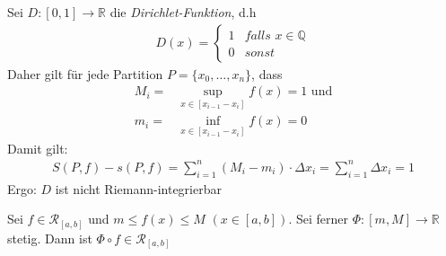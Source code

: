 \begin{Beispiel}{
	Sei $D:[0,1] \rightarrow \mathbb{R}$ die \emph{Dirichlet-Funktion}, d.h
	\begin{align*}
		D(x) = \begin{cases}
			1 & \textit{falls } x \in \mathbb{Q} \\
			0 & sonst
		\end{cases}
	\end{align*}
	Daher gilt für jede Partition $P = \{x_0, \hdots, x_n\}$, dass 
	\begin{align*}
		M_i = & \sup_{x \in [x_{i-1}-x_i]} f(x) = 1 \text{ und}\\
		m_i = & \inf_{x \in [x_{i-1}-x_i]} f(x) = 0
	\end{align*}
	Damit gilt:
	\begin{align*}
		S(P,f) - s(P,f) = \sum_{i = 1}^n (M_i - m_i) \cdot \Delta x_i 
		= \sum_{i = 1}^n \Delta x_i = 1
	\end{align*}
	Ergo: $D$ ist nicht Riemann-integrierbar
}\end{Beispiel}

\begin{Satz}{\label{vl_11_satz23}
	Sei $f \in \mathcal{R}_{[a,b]}$ und $m \leq f(x) \leq M$ $ (x \in [a,b])$.
	Sei ferner  \linebreak $\Phi : [m, M] \rightarrow \mathbb{R}$ stetig. 
	Dann ist $\Phi \circ f \in \mathcal{R}_{[a,b]}$ \\
}\end{Satz}


